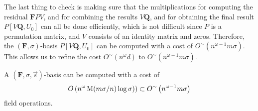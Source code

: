 The last thing to check is making sure that the multiplications for
computing the residual $\mathbf{F}PV$, and for combining the results
$V\mathbf{Q}$, and for obtaining the final result $P\left[V\mathbf{Q},U_{0}\right]$
can all be done efficiently, which is not difficult since $P$ is
a permutation matrix, and $V$ consists of an identity matrix and
zeros. Therefore, the $(\mathbf{F},\sigma)$-basis $P\left[V\mathbf{Q},U_{0}\right]$
can be computed with a cost of $O^{\sim}\left(n^{\omega-1}m\sigma\right)$.
This allows us to refine the cost $O^{\sim}\left(n^{\omega}d\right)$
to $O^{\sim}\left(n^{\omega-1}m\sigma\right)$.
\begin{thm}
\label{thm:orderBasisCostCeilingRemoved}A $\left(\mathbf{F},\sigma,\vec{s}\right)$-basis
can be computed with a cost of 
\[
O\left(n^{\omega}\M(m\sigma/n)\log\sigma)\right)\subset O^{\sim}\left(n^{\omega-1}m\sigma\right)
\]
 field operations. %
\begin{comment}
Should easily work for the second unbalanced case as well. But need
to write it out.
\end{comment}
\end{thm}

